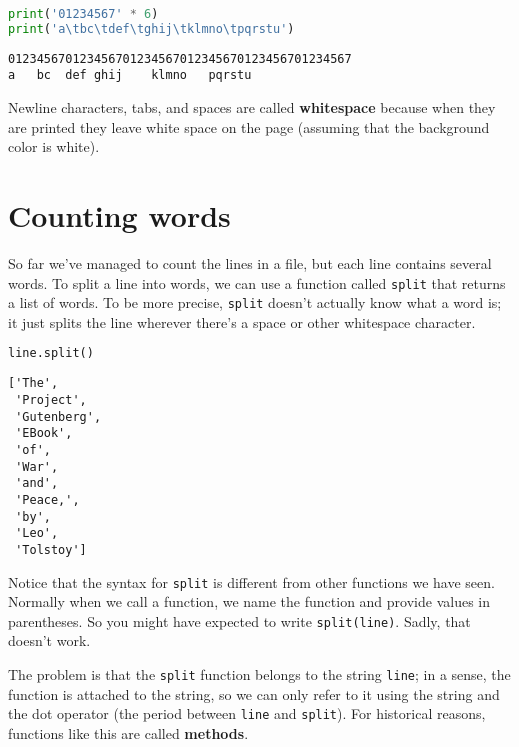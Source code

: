 \begin{lstlisting}[language=Python,style=source]
print('01234567' * 6)
print('a\tbc\tdef\tghij\tklmno\tpqrstu')
\end{lstlisting}

\begin{lstlisting}[style=output]
012345670123456701234567012345670123456701234567
a   bc  def ghij    klmno   pqrstu
\end{lstlisting}

Newline characters, tabs, and spaces are called \textbf{whitespace}
because when they are printed they leave white space on the page
(assuming that the background color is white).

\hypertarget{counting-words}{%
\section{Counting words}\label{counting-words}}

So far we've managed to count the lines in a file, but each line
contains several words. To split a line into words, we can use a
function called \passthrough{\lstinline!split!} that returns a list of
words. To be more precise, \passthrough{\lstinline!split!} doesn't
actually know what a word is; it just splits the line wherever there's a
space or other whitespace character.

\begin{lstlisting}[language=Python,style=source]
line.split()
\end{lstlisting}

\begin{lstlisting}[style=output]
['The',
 'Project',
 'Gutenberg',
 'EBook',
 'of',
 'War',
 'and',
 'Peace,',
 'by',
 'Leo',
 'Tolstoy']
\end{lstlisting}

Notice that the syntax for \passthrough{\lstinline!split!} is different
from other functions we have seen. Normally when we call a function, we
name the function and provide values in parentheses. So you might have
expected to write \passthrough{\lstinline!split(line)!}. Sadly, that
doesn't work.

The problem is that the \passthrough{\lstinline!split!} function belongs
to the string \passthrough{\lstinline!line!}; in a sense, the function
is attached to the string, so we can only refer to it using the string
and the dot operator (the period between \passthrough{\lstinline!line!}
and \passthrough{\lstinline!split!}). For historical reasons, functions
like this are called \textbf{methods}.

